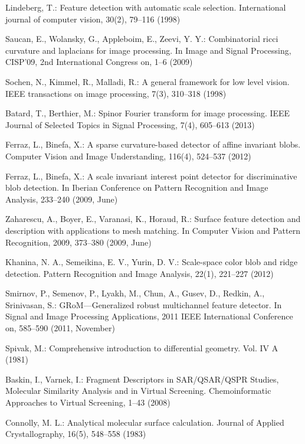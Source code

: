 \documentclass{llncs}
\begin{document}
\begin{thebibliography}{16}
%
Lindeberg, T.:
Feature detection with automatic scale selection. 
International journal of computer vision, 30(2), 79--116 (1998)

Saucan, E., Wolansky, G., Appleboim, E., Zeevi, Y. Y.:
Combinatorial ricci curvature and laplacians for image processing. 
In Image and Signal Processing, CISP'09, 2nd International Congress on, 1--6 (2009)

Sochen, N., Kimmel, R., Malladi, R.: 
A general framework for low level vision. 
IEEE transactions on image processing, 7(3), 310--318 (1998)

Batard, T., Berthier, M.:
Spinor Fourier transform for image processing. 
IEEE Journal of Selected Topics in Signal Processing, 7(4), 605--613 (2013)

Ferraz, L., Binefa, X.:
A sparse curvature-based detector of affine invariant blobs. 
Computer Vision and Image Understanding, 116(4), 524--537 (2012)

Ferraz, L., Binefa, X.:
A scale invariant interest point detector for discriminative blob detection. 
In Iberian Conference on Pattern Recognition and Image Analysis, 233--240  (2009, June)

Zaharescu, A., Boyer, E., Varanasi, K., Horaud, R.:
Surface feature detection and description with applications to mesh matching. 
In Computer Vision and Pattern Recognition, 2009, 373--380 (2009, June)

Khanina, N. A., Semeikina, E. V., Yurin, D. V.:
Scale-space color blob and ridge detection. 
Pattern Recognition and Image Analysis, 22(1), 221--227 (2012)

Smirnov, P., Semenov, P., Lyakh, M., Chun, A., Gusev, D., Redkin, A., Srinivasan, S.:
GRoM—Generalized robust multichannel feature detector. 
In Signal and Image Processing Applications, 2011 IEEE International Conference on, 585--590 (2011, November)

Spivak, M.: 
Comprehensive introduction to differential geometry.
Vol. IV A (1981)

Baskin, I., Varnek, I.:
Fragment Descriptors in SAR/QSAR/QSPR Studies, Molecular Similarity Analysis and in Virtual Screening.
Chemoinformatic Approaches to Virtual Screening, 1--43 (2008)

Connolly, M. L.:
Analytical molecular surface calculation. 
Journal of Applied Crystallography, 16(5), 548--558 (1983)


\end{thebibliography}
\end{document}
